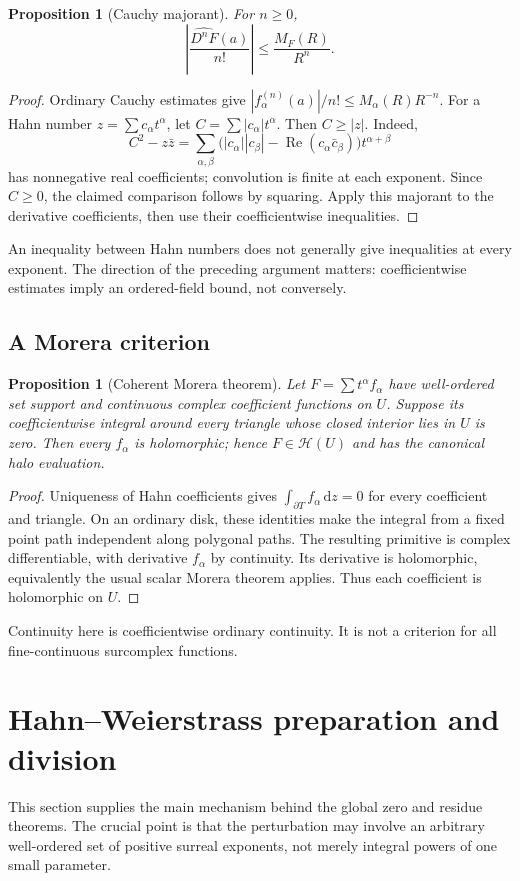 \documentclass[11pt,a4paper]{article}
\newtheorem{proposition}[theorem]{Proposition}
\theoremstyle{definition}\newtheorem{definition}[theorem]{Definition}
\theoremstyle{remark}\newtheorem{remark}[theorem]{Remark}
\newcommand{\A}{\mathscr H}\newcommand{\hol}{\mathcal O}
\newcommand{\ev}[1]{\widehat{#1}}
\newcommand{\dd}{\,\mathrm d}
\numberwithin{equation}{section}
\begin{document}
\begin{proposition}[Cauchy majorant]\label{prop:Cauchyestimate}
For $n\geq0$,
\[
 \left|\frac{\ev{D^nF}(a)}{n!}\right|
 \leq \frac{M_F(R)}{R^n}.
\]
\end{proposition}
\begin{proof}
Ordinary Cauchy estimates give
$|f_\alpha^{(n)}(a)|/n!\leq M_\alpha(R)R^{-n}$.
For a Hahn number $z=\sum c_\alpha t^\alpha$, let
$C=\sum |c_\alpha|t^\alpha$. Then $C\geq|z|$. Indeed,
\[
 C^2-z\bar z
 =\sum_{\alpha,\beta}
 \bigl(|c_\alpha||c_\beta|-\operatorname{Re}(c_\alpha\bar c_\beta)\bigr)
 t^{\alpha+\beta}
\]
has nonnegative real coefficients; convolution is finite at each exponent. Since $C\geq0$, the claimed comparison follows by squaring. Apply this majorant to the derivative coefficients, then use their coefficientwise inequalities.
\end{proof}
An inequality between Hahn numbers does not generally give inequalities at every exponent. The direction of the preceding argument matters: coefficientwise estimates imply an ordered-field bound, not conversely.

\subsection{A Morera criterion}
\begin{proposition}[Coherent Morera theorem]\label{prop:Morera}
Let $F=\sum t^\alpha f_\alpha$ have well-ordered set support and continuous complex coefficient functions on $U$. Suppose its coefficientwise integral around every triangle whose closed interior lies in $U$ is zero. Then every $f_\alpha$ is holomorphic; hence $F\in\A(U)$ and has the canonical halo evaluation.
\end{proposition}
\begin{proof}
Uniqueness of Hahn coefficients gives $\int_{\partial T}f_\alpha\dd z=0$ for every coefficient and triangle. On an ordinary disk, these identities make the integral from a fixed point path independent along polygonal paths. The resulting primitive is complex differentiable, with derivative $f_\alpha$ by continuity. Its derivative is holomorphic, equivalently the usual scalar Morera theorem applies. Thus each coefficient is holomorphic on $U$.
\end{proof}
Continuity here is coefficientwise ordinary continuity. It is not a criterion for all fine-continuous surcomplex functions.

\section{Hahn--Weierstrass preparation and division}\label{sec:preparation}
This section supplies the main mechanism behind the global zero and residue theorems. The crucial point is that the perturbation may involve an arbitrary well-ordered set of positive surreal exponents, not merely integral powers of one small parameter.
\end{document}
